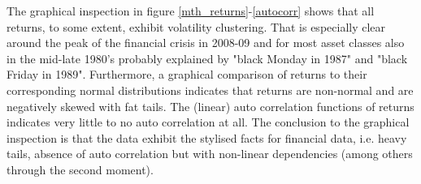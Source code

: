\documentclass[11pt,a4paper,oneside]{article}
\begin{document}
\noindent The graphical inspection in figure \ref{mth_returns}-\ref{autocorr} shows that all returns, to some extent, exhibit volatility clustering. That is especially clear around the peak of the financial crisis in 2008-09 and for most asset classes also in the mid-late 1980's probably explained by "black Monday in 1987" and "black Friday in 1989". Furthermore, a graphical comparison of returns to their corresponding normal distributions indicates that returns are non-normal and are negatively skewed with fat tails. The (linear) auto correlation functions of returns indicates very little to no auto correlation at all. The conclusion to the graphical inspection is that the data exhibit the stylised facts for financial data, i.e. heavy tails, absence of auto correlation but with non-linear dependencies (among others through the second moment)\cite{Cont}.  




\end{document}
